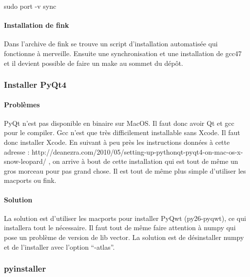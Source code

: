 \documentclass[12pt,a4paper]{article}
\begin{document}

        sudo port -v sync\\

        \paragraph{Installation de fink}
        Dans l'archive de fink se trouve un script d'installation automatisée qui
        fonctionne à merveille. Ensuite une synchronisation et une installation de
        gcc47 et il devient possible de faire un make au sommet du dépôt.

        \subsubsection{Installer PyQt4}

        \paragraph{Problèmes}

        PyQt n'est pas disponible en binaire sur MacOS. Il faut donc avoir Qt et
        gcc pour le compiler.  Gcc n'est que très difficilement installable sans
        Xcode. Il faut donc installer Xcode.  En suivant à peu près les
        instructions données à cette adresse : \newline
        http://deanezra.com/2010/05/setting-up-pythonqt-pyqt4-on-mac-os-x-snow-leopard/\newline
        , on arrive à bout de cette installation qui est tout de même un gros
        morceau pour pas grand chose. Il est tout de même plus simple d'utiliser
        les macports ou fink.\\
    
        \paragraph{Solution}

        La solution est d'utiliser les macports pour installer PyQwt
        (py26-pyqwt), ce qui installera tout le n\'ecessaire. Il faut tout de
        même faire attention à numpy qui pose un problème de version de lib
        vector. La solution est de d\'esinstaller numpy et de l'installer avec
        l'option ``-atlas''. 

        \subsubsection{pyinstaller}
\end{document}
